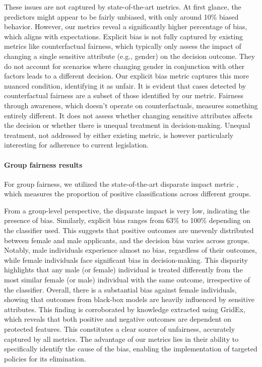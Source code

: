 \documentclass[letterpaper]{article} %
\begin{document}
These issues are not captured by state-of-the-art metrics. At first glance, the predictors might appear to be fairly unbiased, with only around 10\% biased behavior. However, our metrics reveal a significantly higher percentage of bias, which aligns with expectations.
%
Explicit bias is not fully captured by existing metrics like counterfactual fairness, which typically only assess the impact of changing a single sensitive attribute (e.g., gender) on the decision outcome. They do not account for scenarios where changing gender in conjunction with other factors leads to a different decision. Our explicit bias metric captures this more nuanced condition, identifying it as unfair. It is evident that cases detected by counterfactual fairness are a subset of those identified by our metric.
%
Fairness through awareness, which doesn’t operate on counterfactuals, measures something entirely different. It does not assess whether changing sensitive attributes affects the decision or whether there is unequal treatment in decision-making.
%
Unequal treatment, not addressed by either existing metric, is however particularly interesting for adherence to current legislation.

\paragraph{Group fairness results}
For group fairness, we utilized the state-of-the-art disparate impact metric \cite{FeldmanFMSV15}, which measures the proportion of positive classifications across different groups.

From a group-level perspective, the disparate impact is very low, indicating the presence of bias. Similarly, explicit bias ranges from 63\% to 100\% depending on the classifier used. This suggests that positive outcomes are unevenly distributed between female and male applicants, and the decision bias varies across groups.
%
Notably, male individuals experience almost no bias, regardless of their outcomes, while female individuals face significant bias in decision-making. This disparity highlights that any male (or female) individual is treated differently from the most similar female (or male) individual with the same outcome, irrespective of the classifier.
%
Overall, there is a substantial bias against female individuals, showing that outcomes from black-box models are heavily influenced by sensitive attributes. This finding is corroborated by knowledge extracted using GridEx, which reveals that both positive and negative outcomes are dependent on protected features. This constitutes a clear source of unfairness, accurately captured by all metrics. The advantage of our metrics lies in their ability to specifically identify the cause of the bias, enabling the implementation of targeted policies for its elimination.
\end{document}

